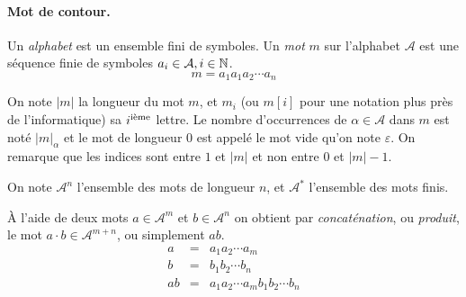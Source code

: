 \paragraph{\bf Mot de contour.}

Un \emph{alphabet} est un ensemble fini de symboles. Un \emph{mot} $m$ sur l'alphabet $\mathcal{A}$ est une séquence finie de symboles $a_i \in \mathcal{A}, i \in \mathbb{N}$.
\[
m = a_1 a_1 a_2 \cdots a_{n} 
\]

On note $|m|$ la longueur du mot $m$, et $m_i$ (ou $m[i]$ pour une notation plus près de l'informatique) sa $i^{\rm i\grave{e}me}$ lettre. Le nombre d'occurrences de $\alpha \in \mathcal{A}$ dans $m$ est noté $|m|_\alpha$ et le mot de longueur $0$ est appelé le mot vide qu'on note $\varepsilon$. On remarque que les indices sont entre $1$ et $|m|$ et non entre $0$ et $|m|-1$.

On note $\mathcal{A}^n$ l'ensemble des mots de longueur $n$, et $\mathcal{A}^*$ l'ensemble des mots finis. 

\begin{definition*}
À l'aide de deux mots $a \in \mathcal{A}^m$ et $b \in \mathcal{A}^n$ on obtient par \emph{concaténation}, ou \emph{produit}, le mot $a \cdot b\in \mathcal{A}^{m+n}$, ou simplement $ab$. 
\begin{eqnarray*}
a & = & a_1 a_2 \cdots a_m \\
b & = & b_1 b_2 \cdots b_n \\
ab & = & a_1 a_2 \cdots a_m b_1 b_2 \cdots b_n \\
\end{eqnarray*}
\end{definition*}


